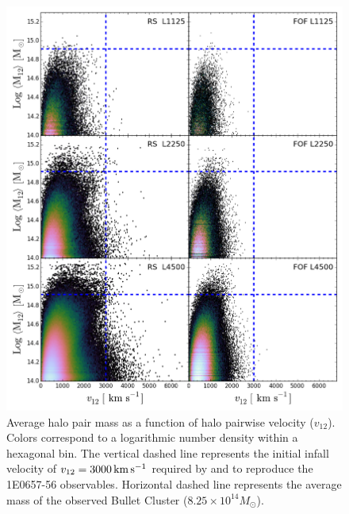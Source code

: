 \documentclass[useAMS, usenatbib]{mn2e}
\newcommand{\Msun}{M_{\odot}}
\newcommand{\vonetwo}{v_{12}}
\newcommand{\kms}{\,\rm{km}\,\rm{s}^{-1}}
\begin{document}
\begin{figure}
\includegraphics[scale=0.33]{figure2.png}
\caption{Average halo pair mass as a function of halo pairwise velocity ($\vonetwo$).  Colors correspond to a logarithmic number density within a hexagonal bin.
The vertical dashed line represents the initial infall velocity of $\vonetwo=3000\kms$ required by \citet{Mast08} and \citet{Lage14} to reproduce the 1E0657-56 observables.
Horizontal dashed line represents the average mass of the observed Bullet Cluster ($8.25\times10^{14}\Msun$).
}
\label{fig:v12}
\end{figure}
\end{document}

